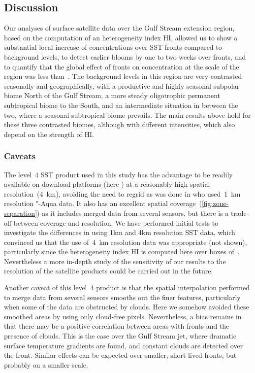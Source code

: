 \subsection{Discussion}

Our analyses of surface satellite data over the Gulf Stream extension region, based on the computation of an heterogeneity index HI, allowed us to show a substantial local increase of  concentrations over SST fronts compared to background levels, to detect earlier blooms by one to two weeks over fronts, and to quantify that the global effect of fronts on  concentration at the scale of the region was less than~.
The background levels in this region are very contrasted seasonally and geographically, with a productive and highly seasonal subpolar biome North of the Gulf Stream, a more steady oligotrophic permanent subtropical biome to the South, and an intermediate situation in between the two, where a seasonal subtropical biome prevails.
The main results above hold for these three contrasted biomes, although with different intensities, which also depend on the strength of HI\@.

\subsubsection{Caveats}

The level~4 SST product used in this study has the advantage to be readily available on download platforms (here ) at a reasonably high spatial resolution~(\qty{4}{\km}), avoiding the need to regrid as was done in \textcite{liu_2016} who used~\qty{1}{\km} resolution  "-Aqua data.
It also has an excellent spatial coverage~(\cref{fig:zone-separation}) as it includes merged data from several sensors, but there is a trade-off between coverage and resolution.
We have performed initial tests to investigate the differences in using 1km and 4km resolution SST data, which convinced us that the use of~\qty{4}{\km} resolution data was appropriate (not shown), particularly since the heterogeneity index HI is computed here over boxes of~.
Nevertheless a more in-depth study of the sensitivity of our results to the resolution of the satellite products could be carried out in the future.

Another caveat of this level~4 product is that the spatial interpolation performed to merge data from several sensors smooths out the finer features, particularly when some of the data are obstructed by clouds.
Here we somehow avoided these smoothed areas by using only cloud-free  pixels.
Nevertheless, a bias remains in that there may be a positive correlation between areas with fronts and the presence of clouds.
This is the case over the Gulf Stream jet, where dramatic surface temperature gradients are found, and constant clouds are detected over the front.
Similar effects can be expected over smaller, short-lived fronts, but probably on a smaller scale.

